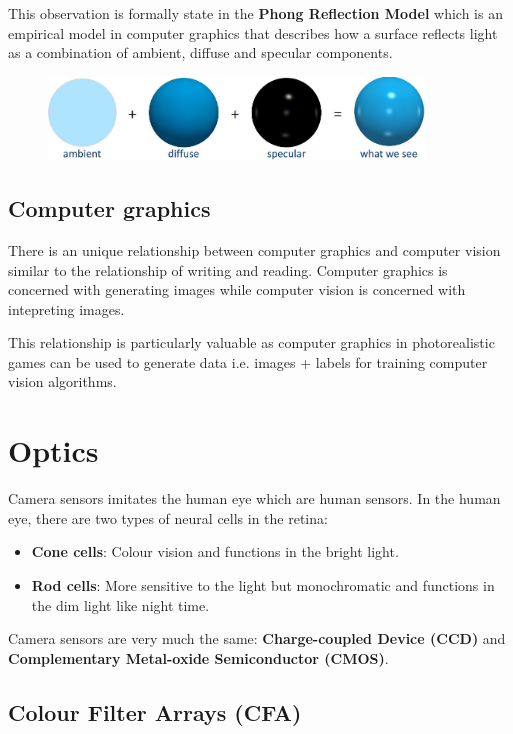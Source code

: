 \documentclass{report}
\begin{document}
This observation is formally state in the \textbf{Phong Reflection Model} which
is an empirical model in computer graphics that describes how a surface reflects
light as a combination of ambient, diffuse and specular components. 
\begin{figure}[h]
    \centering
    \includegraphics[width=10cm]{Phong reflection model.JPG}
\end{figure}

\subsection{Computer graphics}

There is an unique relationship between computer graphics and computer vision
similar to the relationship of writing and reading. Computer graphics is
concerned with generating images while computer vision is concerned with
intepreting images. 

This relationship is particularly valuable as computer graphics in
photorealistic games can be used to generate data i.e. images + labels for
training computer vision algorithms. 

\section{Optics}

Camera sensors imitates the human eye which are human sensors. In the human eye,
there are two types of neural cells in the retina: 
\begin{itemize}
    \item \textbf{Cone cells}: Colour vision and functions in the bright light. 
    \item \textbf{Rod cells}: More sensitive to the light but monochromatic and
    functions in the dim light like night time. 
\end{itemize}

Camera sensors are very much the same: \textbf{Charge-coupled Device (CCD)} and
\textbf{Complementary Metal-oxide Semiconductor (CMOS)}.

\subsection{Colour Filter Arrays (CFA)}
\end{document}
